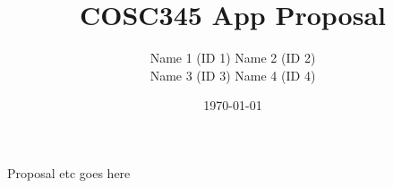 \documentclass{article}
\title{COSC345 App Proposal}
\author{Name 1 (ID 1) Name 2 (ID 2) \\ Name 3 (ID 3) Name 4 (ID 4)}
\date{\today}
\begin{document}
	\maketitle
	
	Proposal etc goes here
\end{document}
